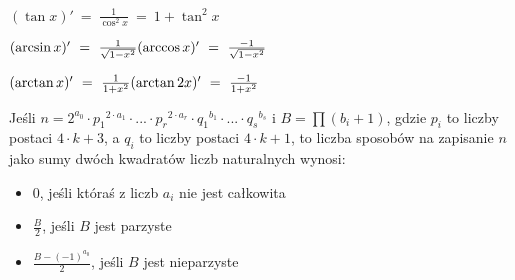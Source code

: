 $(\tan x)'\ =\ \frac{1}{\cos^2 x}\ =\ 1 + \tan^2 x$

$(\arcsin x)'\ =\ \frac{1}{\sqrt{1-x^2}} \hfill
	(\arccos x)'\ =\ \frac{-1}{\sqrt{1-x^2}}$

$(\arctan x)'\ =\ \frac{1}{1+x^2} \hfill
	(\arctan2 x)'\ =\ \frac{-1}{1+x^2}$

Jeśli $n=2^{a_0} \cdot {p_1}^{2 \cdot a_1} \cdot ... \cdot {p_r}^{2 \cdot a_r} \cdot {q_1}^{b_1} \cdot ... \cdot {q_s}^{b_s}$ i $B= \prod (b_i+1)$, gdzie $p_i$ to liczby postaci $4 \cdot k + 3$, a $q_i$ to liczby postaci $4 \cdot k + 1$, to liczba sposobów na zapisanie $n$ jako sumy dwóch kwadratów liczb naturalnych wynosi:
      \begin{itemize}
        \item 0, jeśli któraś z liczb $a_i$ nie jest całkowita
        \item $\frac{B}{2}$, jeśli $B$ jest parzyste
        \item $\frac{B-(-1)^{a_0}}{2}$, jeśli $B$ jest nieparzyste
      \end{itemize}

